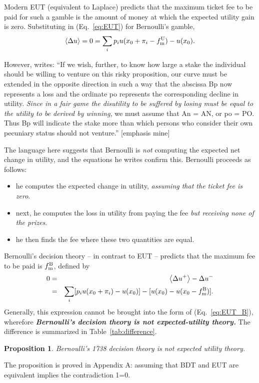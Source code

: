 \documentclass[final]{ectaart}
\newcommand{\ave}[1]{\left\langle#1 \right\rangle}
\newcommand{\bi}{\begin{itemize}}
\newcommand{\ei}{\end{itemize}}
\newcommand{\elabel}[1]{\label{eq:#1}}
\newcommand{\eref}[1]{(Eq.~\ref{eq:#1})}
\newcommand{\tref}[1]{Table~\ref{tab:#1}}
\newcommand{\be}{\begin{equation}}
\newcommand{\ee}{\end{equation}}
\newcommand{\bea}{\begin{eqnarray}}
\newcommand{\eea}{\end{eqnarray}}
\newcommand{\Du}{\Delta u}
\newcommand{\tml}{{f_{\text{\normalfont{m}}}^{\text{\normalfont{U}}}}}
\newcommand{\tmb}{{f_{\text{\normalfont{m}}}^{\text{\normalfont{B}}}}}
\theoremstyle{plain}
\newtheorem{prop}[thm]{Proposition}
\begin{document}
Modern EUT (equivalent to Laplace) predicts that the maximum ticket fee to be paid for such a gamble is the amount of money at which the expected utility gain is zero. Substituting in \eref{EUT} for Bernoulli's gamble,
\be
\ave{\Du}=0=\sum_i p_i u(x_0+\pi_i-\tml) - u(x_0).
\elabel{EUT_B}
\ee

However, \citet[p.~26--27]{Bernoulli1738} writes:
``If we wish, further, to know how large a stake the individual should be willing to venture on this risky proposition, our curve must be extended in the opposite direction in such a way that the abscissa Bp now represents a loss and the ordinate po represents the corresponding decline in utility. {\it Since in a fair game the disutility to be suffered by losing must be equal to the utility to be derived by winning,} we must assume that An = AN, or po = PO. Thus Bp will indicate the stake more than which persons who consider their own pecuniary status should not venture.'' [emphasis mine]

The language here suggests that Bernoulli is {\it not} computing the expected net change in utility, and the equations he writes confirm this. Bernoulli proceeds as follows:
\bi
\item
he computes the expected change in utility, {\it assuming that the ticket fee is zero}.
\item
next, he computes the loss in utility from paying the fee {\it but receiving none of the prizes}.
\item
he then finds the fee where these two quantities are equal.  
\ei 
Bernoulli's decision theory -- in contrast to EUT -- predicts that the maximum fee to be paid is $\tmb$, defined by
\bea
0&=&\ave{\Du^+}-\Du^-\\
&=&\sum_i [p_i u(x_0+\pi_i) -u(x_0)] - [ u(x_0)-u(x_0-\tmb)].
\elabel{ub}
\eea
Generally, this expression cannot be brought into the form of \eref{EUT_B}, wherefore {\it \bf Bernoulli's decision theory is not expected-utility theory.} The difference is summarized in \tref{difference}.
\begin{prop}
Bernoulli's 1738 decision theory is not expected utility theory.
\end{prop}
The proposition is proved in Appendix A: assuming that BDT and EUT are equivalent implies the contradiction 1=0.
\end{document}

